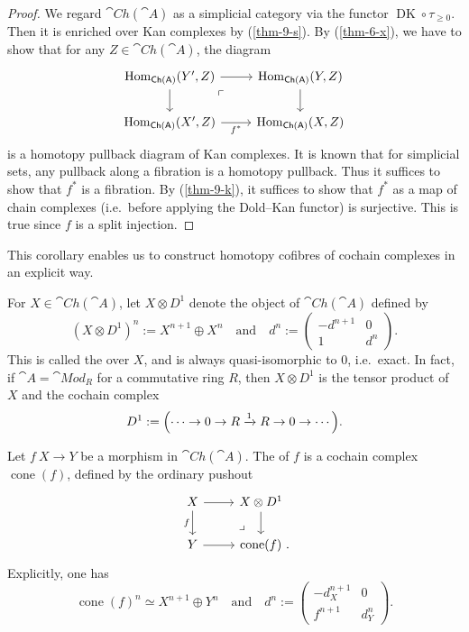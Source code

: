 \begin{proof}
    We regard $\cat{Ch}(\cat{A})$ as a simplicial category
    via the functor ${\operatorname{DK}}\circ\tau_{\geq0}$.
    Then it is enriched over Kan complexes by (\ref{thm-9-s}).
    By (\ref{thm-6-x}),
    we have to show that for any $Z\in\cat{Ch}(\cat{A})$, the diagram 
    \[ \begin{tikzcd}
        \Hom_{\cat{Ch}(\cat{A})}(Y',Z) \ar[d] \ar[r] \ar[dr,phantom,pos=.25,"\ulcorner"] &
        \Hom_{\cat{Ch}(\cat{A})}(Y,Z) \ar[d] \\
        \Hom_{\cat{Ch}(\cat{A})}(X',Z) \ar[r,"f^*"'] &
        \Hom_{\cat{Ch}(\cat{A})}(X,Z)
    \end{tikzcd} \]
    is a homotopy pullback diagram of Kan complexes.
    It is known that for simplicial sets,
    any pullback along a fibration is a homotopy pullback.
    Thus it suffices to show that $f^*$ is a fibration.
    By (\ref{thm-9-k}), it suffices to show that $f^*$
    as a map of chain complexes (i.e.\ before applying the Dold--Kan functor)
    is surjective. This is true since $f$ is a split injection.
\end{proof}

This corollary enables us to construct 
homotopy cofibres of cochain complexes in an explicit way. 

For $X\in\cat{Ch}(\cat{A})$, let $X\otimes D^1$ denote the object of $\cat{Ch}(\cat{A})$
defined by
\[ (X\otimes D^1)^n:=X^{n+1}\oplus X^n\quad\text{and}\quad d^n:=\begin{pmatrix}
    -d^{n+1} & 0 \\ 1 & d^n
\end{pmatrix}. \]
This is called the  over $X$, and is always quasi-isomorphic to $0$,
i.e.\ exact.
In fact, if $\cat{A}=\cat{Mod}_R$ for a commutative ring $R$,
then $X\otimes D^1$ is the tensor product of $X$ and the cochain complex 
\[D^1:=\Bigl(\cdots\to0\to R\xrightarrow1R\to0\to\cdots\Bigr).\]

\begin{definition}
    Let $f\:X\to Y$ be a morphism in $\cat{Ch}(\cat{A})$.
    The  of $f$ is a cochain complex $\operatorname{cone}(f)$,
    defined by the ordinary pushout
    \[\begin{tikzcd}
        X\ar[r]\ar[d,"f"']\ar[dr,phantom,pos=.75,"\lrcorner",end anchor={[xshift=-.5em]north}] & X\otimes D^1\ar[d] \\
        Y\ar[r] & \operatorname{cone}(f)\rlap{\ .}
    \end{tikzcd}\]
    Explicitly, one has
    \[ \operatorname{cone}(f)^n\simeq X^{n+1}\oplus Y^n\quad\text{and}\quad d^n:=\begin{pmatrix}
        -d^{n+1}_X & 0 \\ f^{n+1} & d^n_Y
    \end{pmatrix}. \]
\end{definition}

